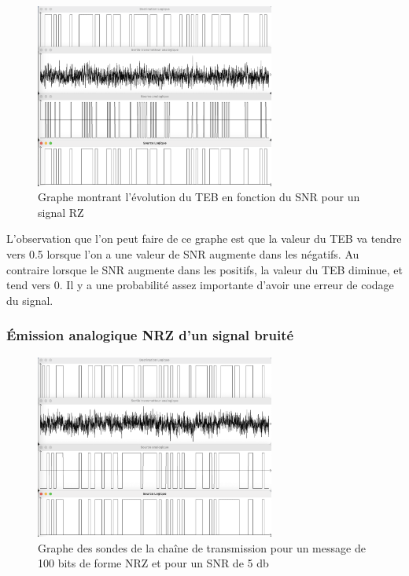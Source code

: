 \begin{figure}[H]
    \centering
    \includegraphics[width=0.7\textwidth]{img/etape3_emission_RZ_bruite.png}
    \caption{Graphe montrant l'évolution du TEB en fonction du SNR pour un signal RZ }
    \label{fig:etape_3_RZ_bruite}
\end{figure}

L'observation que l'on peut faire de ce graphe est que la valeur du TEB va tendre vers 0.5 lorsque l'on a une valeur de SNR augmente dans les négatifs. Au contraire lorsque le SNR augmente dans les positifs, la valeur du TEB diminue, et tend vers 0. Il y a une probabilité assez importante d'avoir une erreur de codage du signal.


\subsubsection{Émission analogique NRZ d'un signal bruité}

\begin{figure}[H]
    \centering
    \includegraphics[width=0.7\textwidth]{img/etape3_emission_NRZ_bruite.png}
    \caption{Graphe des sondes de la chaîne de transmission pour un message de 100 bits de forme NRZ et pour un SNR de 5 db}
    \label{fig:etape_3_NRZ_bruite}
\end{figure}

